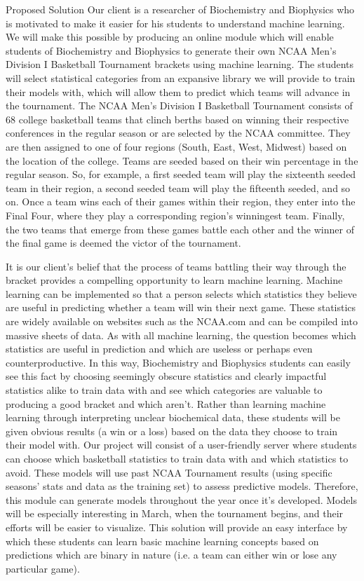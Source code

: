 \documentclass[letterpaper,20pt,titlepage]{article}
\begin{document}
\begin{section}{Proposed Solution}
Our client is a researcher of Biochemistry and Biophysics who is motivated to make it easier for his students to understand machine learning. We will make this possible by producing an online module which will enable students of Biochemistry and Biophysics to generate their own NCAA Men's Division I Basketball Tournament brackets using machine learning. The students will select statistical categories from an expansive library we will provide to train their models with, which will allow them to predict which teams will advance in the tournament. The NCAA Men’s Division I Basketball Tournament consists of 68 college basketball teams that clinch berths based on winning their respective conferences in the regular season or are selected by the NCAA committee. They are then assigned to one of four regions (South, East, West, Midwest) based on the location of the college. Teams are seeded based on their win percentage in the regular season. So, for example, a first seeded team will play the sixteenth seeded team in their region, a second seeded team will play the fifteenth seeded, and so on. Once a team wins each of their games within their region, they enter into the Final Four, where they play a corresponding region’s winningest team. Finally, the two teams that emerge from these games battle each other and the winner of the final game is deemed the victor of the tournament. \par It is our client's belief that the process of teams battling their way through the bracket provides a compelling opportunity to learn machine learning. Machine learning can be implemented so that a person selects which statistics they believe are useful in predicting whether a team will win their next game. These statistics are widely available on websites such as the NCAA.com and can be compiled into massive sheets of data. As with all machine learning, the question becomes which statistics are useful in prediction and which are useless or perhaps even counterproductive. In this way, Biochemistry and Biophysics students can easily see this fact by choosing seemingly obscure statistics and clearly impactful statistics alike to train data with and see which categories are valuable to producing a good bracket and which aren't. Rather than learning machine learning through interpreting unclear biochemical data, these students will be given obvious results (a win or a loss) based on the data they choose to train their model with. Our project will consist of a user-friendly server where students can choose which basketball statistics to train data with and which statistics to avoid. These models will use past NCAA Tournament results (using specific seasons' stats and data as the training set) to assess predictive models. Therefore, this module can generate models throughout the year once it's developed. Models will be especially interesting in March, when the tournament begins, and their efforts will be easier to visualize. This solution will provide an easy interface by which these students can learn basic machine learning concepts based on predictions which are binary in nature (i.e. a team can either win or lose any particular game).
\end{section}
\end{document}
